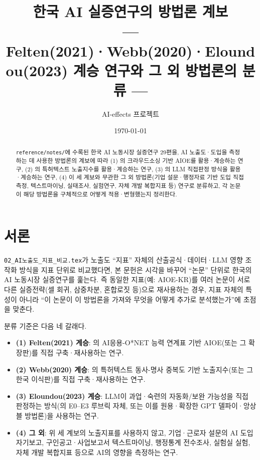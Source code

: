\documentclass[11pt]{article}
\title{한국 AI 실증연구의 방법론 계보\\[1mm]
\large --- Felten(2021)·Webb(2020)·Eloundou(2023) 계승 연구와 그 외 방법론의 분류 ---}
\author{AI-effects 프로젝트}
\date{\today}
\begin{document}
\maketitle

\begin{abstract}
\noindent \texttt{reference/notes/}에 수록된 한국 AI 노동시장 실증연구 29편을, AI 노출도·도입을 측정하는 데 사용한 방법론의 계보에 따라 (1) \citet{felten-2021-occupational-industry-and-geographic-exposure}의 크라우드소싱 기반 AIOE를 활용·계승하는 연구, (2) \citet{webb-2020-impact-artificial-intelligence-labor}의 특허텍스트 노출지수를 활용·계승하는 연구, (3) \citet{eloundou-2023-gpts-are-gpts-an-early}의 LLM 직접판정 방식을 활용·계승하는 연구, (4) 이 세 계보와 무관한 그 외 방법론(기업 설문·행정자료 기반 도입 직접측정, 텍스트마이닝, 실태조사, 실험연구, 자체 개발 복합지표 등) 연구로 분류하고, 각 논문이 해당 방법론을 구체적으로 어떻게 적용·변형했는지 정리한다.
\end{abstract}

\tableofcontents

\section{서론}

\texttt{02\_AI노출도\_지표\_비교.tex}가 노출도 ``지표'' 자체의 산출공식·데이터·LLM 영향 조작화 방식을 지표 단위로 비교했다면, 본 문헌은 시각을 바꾸어 ``논문'' 단위로 한국의 AI 노동시장 실증연구를 훑는다. 즉 동일한 지표(예: AIOE-KR)를 여러 논문이 서로 다른 실증전략(셀 회귀, 삼중차분, 혼합로짓 등)으로 재사용하는 경우, 지표 자체의 특성이 아니라 ``이 논문이 이 방법론을 가져와 무엇을 어떻게 추가로 분석했는가''에 초점을 맞춘다.

분류 기준은 다음 네 갈래다.

\begin{itemize}
  \item \textbf{(1) Felten(2021) 계승}: \citet{felten-2021-occupational-industry-and-geographic-exposure}의 AI응용-O*NET 능력 연계표 기반 AIOE(또는 그 확장판)를 직접 구축·재사용하는 연구.
  \item \textbf{(2) Webb(2020) 계승}: \citet{webb-2020-impact-artificial-intelligence-labor}의 특허텍스트 동사-명사 중복도 기반 노출지수(또는 그 한국 이식판)를 직접 구축·재사용하는 연구.
  \item \textbf{(3) Eloundou(2023) 계승}: LLM이 과업·숙련의 자동화/보완 가능성을 직접 판정하는 방식(\citet{eloundou-2023-gpts-are-gpts-an-early}의 E0--E3 루브릭 자체, 또는 이를 원용·확장한 GPT 델파이·앙상블 방법론)을 사용하는 연구.
  \item \textbf{(4) 그 외}: 위 세 계보의 노출지표를 사용하지 않고, 기업·근로자 설문의 AI 도입 자기보고, 구인공고·사업보고서 텍스트마이닝, 행정통계 전수조사, 실험실 실험, 자체 개발 복합지표 등으로 AI의 영향을 측정하는 연구.
\end{itemize}
\end{document}
